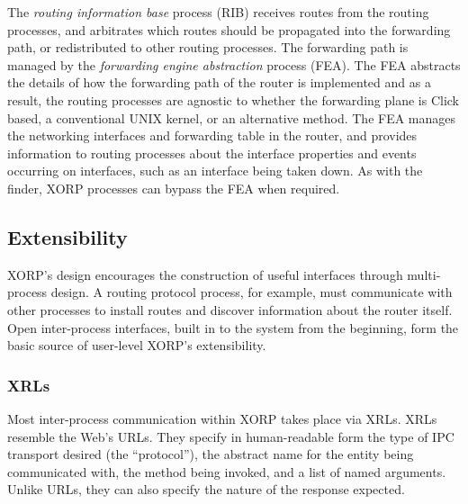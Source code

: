 

The \emph{routing information base} process (RIB) receives routes from
the routing processes, and arbitrates which routes should be
propagated into the forwarding path, or redistributed to other routing
processes.  The forwarding path is managed
by the \emph{forwarding engine abstraction} process (FEA).  The FEA
abstracts the details of how the forwarding path of the router is
implemented and as a result, the routing processes are agnostic to
whether the forwarding plane is Click \cite{click} based, a conventional UNIX
kernel, or an alternative method.  The FEA manages the networking
interfaces and forwarding table in the router, and provides information to routing processes
about the interface properties and events occurring on interfaces, such as an
interface being taken down.  As with the finder, XORP processes can bypass the
FEA when required.


\subsection{Extensibility}

XORP's design encourages the construction of useful
interfaces through multi-process design.
A routing protocol process, for example, must communicate with other
processes to install routes and discover information about the router
itself.
Open inter-process interfaces, built in to the system from the beginning,
form the basic source of user-level XORP's extensibility.

\subsubsection{XRLs}
\def\xrl#1{\textsf{\small #1}}

Most inter-process communication within XORP takes place via XRLs.  XRLs resemble the Web's URLs. They specify in
human-readable form the type of IPC transport desired (the
``protocol''), the abstract name for the entity being communicated
with, the method being invoked, and a list of named arguments.  Unlike
URLs, they can also specify the nature of the response expected.

